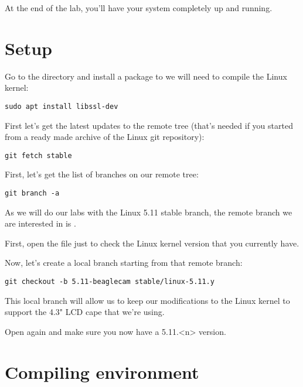 
At the end of the lab, you'll have your system completely up and
running.

\section{Setup}

Go to the  directory and install a
package to we will need to compile the Linux kernel:

\begin{verbatim}
sudo apt install libssl-dev
\end{verbatim}

First let's get the latest updates to the remote  tree
(that's needed if you started from a ready made archive of the Linux git
repository):

\begin{verbatim}
git fetch stable
\end{verbatim}

First, let's get the list of branches on our  remote tree:

\begin{verbatim}
git branch -a
\end{verbatim}

As we will do our labs with the Linux 5.11 stable branch, the remote branch
we are interested in is .

First, open the  file just to check the Linux kernel
version that you currently have.

Now, let's create a local branch starting from that remote branch:
\begin{verbatim}
git checkout -b 5.11-beaglecam stable/linux-5.11.y
\end{verbatim}

This local branch will allow us to keep our modifications to the Linux
kernel to support the 4.3" LCD cape that we're using.

Open  again and make sure you now have a 5.11.<n> version.

\section{Compiling environment}

